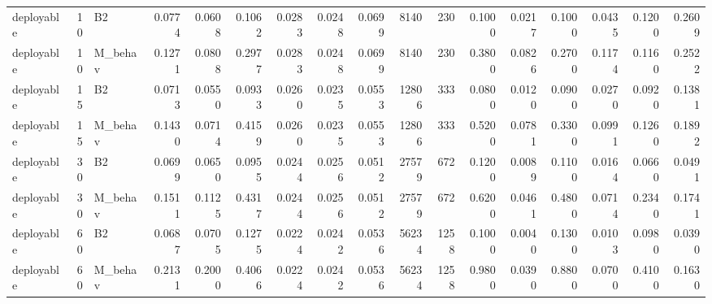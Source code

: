 \begin{table}
\begin{tabular}{lrlrrrrrrrrrrrrrr}
deployable & 10 & B2 & 0.0774 & 0.0608 & 0.1062 & 0.0283 & 0.0248 & 0.0699 & 8140 & 230 & 0.1000 & 0.0217 & 0.1000 & 0.0435 & 0.1200 & 0.2609 \\
deployable & 10 & M\_behav & 0.1271 & 0.0808 & 0.2977 & 0.0283 & 0.0248 & 0.0699 & 8140 & 230 & 0.3800 & 0.0826 & 0.2700 & 0.1174 & 0.1160 & 0.2522 \\
deployable & 15 & B2 & 0.0713 & 0.0550 & 0.0933 & 0.0260 & 0.0235 & 0.0553 & 12806 & 333 & 0.0800 & 0.0120 & 0.0900 & 0.0270 & 0.0920 & 0.1381 \\
deployable & 15 & M\_behav & 0.1430 & 0.0714 & 0.4159 & 0.0260 & 0.0235 & 0.0553 & 12806 & 333 & 0.5200 & 0.0781 & 0.3300 & 0.0991 & 0.1260 & 0.1892 \\
deployable & 30 & B2 & 0.0699 & 0.0650 & 0.0955 & 0.0244 & 0.0256 & 0.0512 & 27579 & 672 & 0.1200 & 0.0089 & 0.1100 & 0.0164 & 0.0660 & 0.0491 \\
deployable & 30 & M\_behav & 0.1511 & 0.1125 & 0.4317 & 0.0244 & 0.0256 & 0.0512 & 27579 & 672 & 0.6200 & 0.0461 & 0.4800 & 0.0714 & 0.2340 & 0.1741 \\
deployable & 60 & B2 & 0.0687 & 0.0705 & 0.1275 & 0.0224 & 0.0242 & 0.0536 & 56234 & 1258 & 0.1000 & 0.0040 & 0.1300 & 0.0103 & 0.0980 & 0.0390 \\
deployable & 60 & M\_behav & 0.2131 & 0.2000 & 0.4066 & 0.0224 & 0.0242 & 0.0536 & 56234 & 1258 & 0.9800 & 0.0390 & 0.8800 & 0.0700 & 0.4100 & 0.1630 \\
\bottomrule
\end{tabular}
\end{table}
